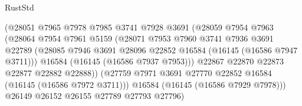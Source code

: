 \begin{lexlean}{RustStd}
\begin{coremodule}
                                      (@28051
                                        @7965
                                        @7978
                                        @7985
                                        @3741
                                        @7928
                                        @3691
                                        (@28059
                                          @7954
                                          @7963
                                          (@28064
                                            @7954
                                            @7961
                                            @5159
                                            (@28071
                                              @7953
                                              @7960
                                              @3741
                                              @7936
                                              @3691
                                              @22789
                                              (@28085
                                                @7946
                                                @3691
                                                @28096
                                                @22852
                                                @16584
                                                (@16145 (@16586 @7947 @3711)))
                                              @16584
                                              (@16145 (@16586 @7937 @7953)))
                                            @22867
                                            @22870
                                            @22873
                                            @22877
                                            @22882
                                            @22888))
                                        (@27759
                                          @7971
                                          @3691
                                          @27770
                                          @22852
                                          @16584
                                          (@16145 (@16586 @7972 @3711)))
                                        @16584
                                        (@16145 (@16586 @7929 @7978)))
                                      @26149
                                      @26152
                                      @26155
                                      @27789
                                      @27793
                                      @27796)

\end{coremodule}
\end{lexlean}
